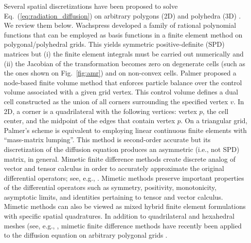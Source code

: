 \documentclass[preprint,10pt]{elsarticle}
\newcommand{\eqt}[1]{Eq.~(\ref{#1})}                     %
\newcommand{\fig}[1]{Fig.~\ref{#1}}                      %
\begin{document}
Several spatial discretizations have been proposed to solve \eqt{eq:radiation_diffusion} on
arbitrary polygons (2D) and polyhedra (3D) \cite{Wachspress,Palmer2001,Kuznetsov2004,Brezzi2005,
LipnikovShashkovSvyatskiy2006,BaileyPhD,BaileyAdams2008,LipnikovShashkov2010}. We review them below.
%
Wachspress \cite{Wachspress} developed a family of rational polynomial functions that can be employed
as basis functions in a finite element method on polygonal/polyhedral grids. This yields
symmetric positive-definite (SPD) matrices but (i) the finite element integrals must be carried out 
numerically and (ii) the Jacobian of the transformation becomes zero on degenerate cells 
(such as the ones shown on \fig{fig:amr}) and on non-convex cells. 
%
Palmer \cite{Palmer2001,PalmerLLNL} proposed a node-based finite volume method 
that enforces particle balance over the control volume associated with a given grid vertex.
This control volume defines a dual cell constructed as 
the union of all corners surrounding the specified vertex $v$. In 2D, a corner 
is a quadrilateral with the following vertices: vertex $p$, the cell center, and the midpoint
of the edges that contain vertex $p$. On a triangular grid, Palmer's scheme is equivalent 
to employing linear continuous finite elements with ``mass-matrix lumping''. This method is 
second-order accurate but its discretization of the diffusion equation produces an 
asymmetric (i.e., not SPD) matrix, in general.
%
Mimetic finite difference methods create discrete analog of vector and tensor
calculus in order to accurately approximate the original differential operators;
see, e.g., \cite{HymanMorelShashkovSteinberg2002}.
Mimetic methods preserve important properties of the differential operators such 
as symmetry, positivity, monotonicity, asymptotic limits, and identities pertaining 
to tensor and vector calculus. Mimetic methods can also be viewed as mixed hybrid 
finite element formulations with specific spatial quadratures.  
In addition to quadrilateral and hexahedral meshes (see, e.g., 
\cite{MorelRobertsShashkov1998,MorelHallShashkov2001}, mimetic finite difference 
methods have recently been applied to the diffusion equation on arbitrary polygonal 
grids \cite{Kuznetsov2004,Brezzi2005,LipnikovShashkovSvyatskiy2006,LipnikovShashkov2010}.
\end{document}
